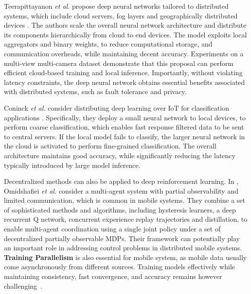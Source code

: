 \documentclass[journal,comsoc,letter]{IEEEtran}
\begin{document}
Teerapittayanon \emph{et al.} propose deep neural networks tailored to distributed systems, which include cloud servers, fog layers and geographically distributed devices \cite{teerapittayanon2017distributed}. The authors scale the overall neural network architecture and distribute its components hierarchically from cloud to end devices. The model exploits local aggregators and binary weights, to reduce computational storage, and communication overheads, while maintaining decent accuracy. Experiments on a multi-view multi-camera  dataset demonstrate that this proposal can perform efficient cloud-based training and local inference. Importantly, without violating latency constraints, the deep neural network obtains essential benefits associated with distributed systems, such as fault tolerance and privacy.

Coninck \emph{et al.} consider distributing deep learning over IoT for classification applications \cite{de2016distributed}. Specifically, they deploy a small neural network to local devices, to perform coarse classification, which enables fast response filtered data to be sent to central servers. If the local model fails to classify, the larger neural network in the cloud is activated to perform fine-grained classification. The overall architecture maintains good accuracy, while significantly reducing the latency typically introduced by large model inference.

Decentralized methods can also be applied to deep reinforcement learning. In \cite{omidshafiei2017deep}, Omidshafiei \emph{et al.} consider a multi-agent system with partial observability and limited communication, which is common in mobile systems. They combine a set of sophisticated methods and algorithms, including hysteresis learners, a deep recurrent Q network, concurrent experience replay trajectories and distillation, to enable multi-agent coordination using a single joint policy under a set of decentralized partially observable MDPs. Their framework can potentially play an important role in addressing control problems in distributed mobile systems. 
\\

\noindent \textbf{Training Parallelism} is also essential for mobile system, as mobile data usually come asynchronously from different sources. Training models effectively while maintaining consistency, fast convergence, and accuracy remains however challenging~\cite{gupta2016model}. 
\end{document}
